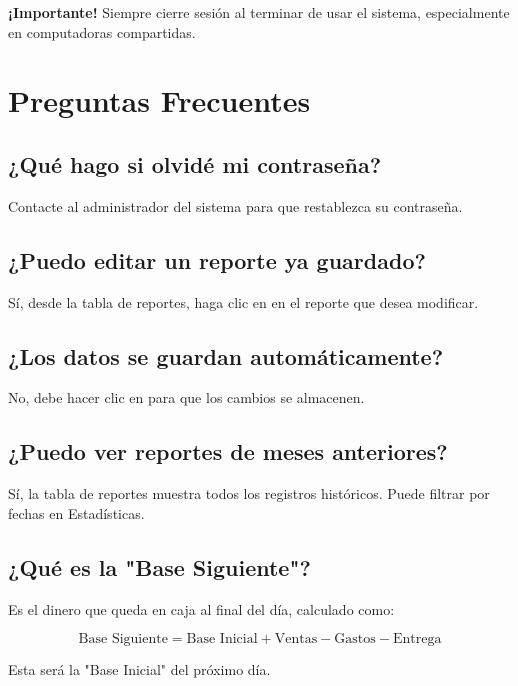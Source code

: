 \documentclass[12pt,a4paper]{article}
\begin{document}
\begin{center}
\textbf{¡Importante!} Siempre cierre sesión al terminar de usar el sistema, especialmente en computadoras compartidas.
\end{center}

\newpage

\section{Preguntas Frecuentes}

\subsection{¿Qué hago si olvidé mi contraseña?}

Contacte al administrador del sistema para que restablezca su contraseña.

\subsection{¿Puedo editar un reporte ya guardado?}

Sí, desde la tabla de reportes, haga clic en  en el reporte que desea modificar.

\subsection{¿Los datos se guardan automáticamente?}

No, debe hacer clic en  para que los cambios se almacenen.

\subsection{¿Puedo ver reportes de meses anteriores?}

Sí, la tabla de reportes muestra todos los registros históricos. Puede filtrar por fechas en Estadísticas.

\subsection{¿Qué es la "Base Siguiente"?}

Es el dinero que queda en caja al final del día, calculado como:

\[
\text{Base Siguiente} = \text{Base Inicial} + \text{Ventas} - \text{Gastos} - \text{Entrega}
\]

Esta será la "Base Inicial" del próximo día.
\end{document}
